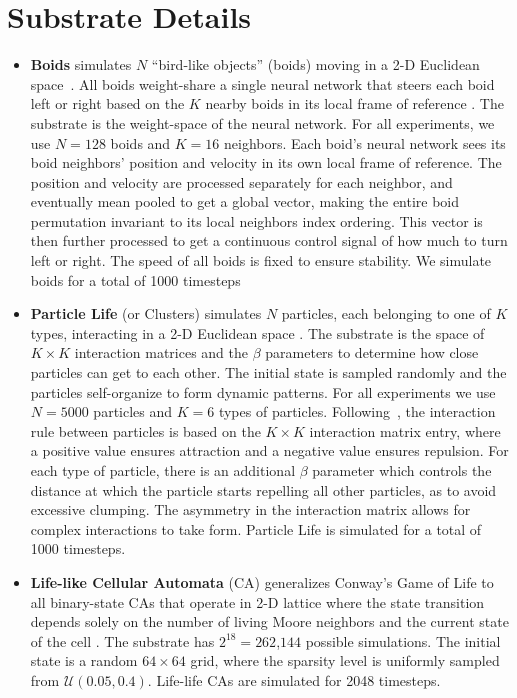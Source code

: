\documentclass{article}
\begin{document}
\section{Substrate Details}
\begin{itemize}
    \item
\textbf{Boids} simulates $N$ ``bird-like objects'' (boids) moving in a 2-D Euclidean space~\citep{reynolds1987flocks}.
All boids weight-share a single neural network that steers each boid left or right based on the $K$ nearby boids in its local frame of reference .
The substrate is the weight-space of the neural network.
For all experiments, we use $N=128$ boids and $K=16$ neighbors.
Each boid's neural network sees its boid neighbors' position and velocity in its own local frame of reference.
The position and velocity are processed separately for each neighbor, and eventually mean pooled to get a global vector, making the entire boid permutation invariant to its local neighbors index ordering.
This vector is then further processed to get a continuous control signal of how much to turn left or right.
The speed of all boids is fixed to ensure stability.
We simulate boids for a total of 1000 timesteps

    \item
\textbf{Particle Life} (or Clusters) simulates $N$ particles, each belonging to one of $K$ types, interacting in a 2-D Euclidean space \citep{ventrella2017clusters, mohr2023particlelife}.
The substrate is the space of $K\times K$ interaction matrices and the $\beta$ parameters to determine how close particles can get to each other.
The initial state is sampled randomly and the particles self-organize to form dynamic patterns.
For all experiments we use $N=5000$ particles and $K=6$ types of particles.
Following~\citep{mohr2023particlelife}, the interaction rule between particles is based on the $K\times K$ interaction matrix entry, where a positive value ensures attraction and a negative value ensures repulsion.
For each type of particle, there is an additional $\beta$ parameter which controls the distance at which the particle starts repelling all other particles, as to avoid excessive clumping. 
The asymmetry in the interaction matrix allows for complex interactions to take form.
Particle Life is simulated for a total of 1000 timesteps.

    \item
\textbf{Life-like Cellular Automata} (CA) generalizes Conway’s Game of Life to all binary-state CAs that operate in 2-D lattice where the state transition depends solely on the number of living Moore neighbors and the current state of the cell \citep{wojtowicz2024cellular}. 
The substrate has $2^{18}=262$,$144$ possible simulations.
The initial state is a random $64\times 64$ grid, where the sparsity level is uniformly sampled from $\mathcal{U}(0.05, 0.4)$.
Life-life CAs are simulated for 2048 timesteps.


\end{itemize}
\end{document}
